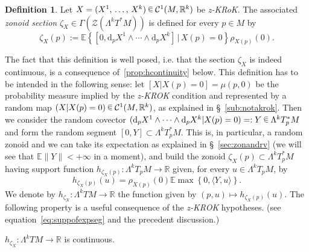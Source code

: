 \documentclass[10pt]{amsart}
\theoremstyle{definition}\newtheorem{defi}[theo]{Definition}\newtheorem{rema}[theo]{Remark}\newtheorem{exam}[theo]{Example}\newtheorem{exem}[theo]{Example}\newtheorem{nota}[theo]{Notation}
\newcommand{\R}{\mathbb{R}}
\newcommand{\EE}{\mathbb{E}}
\newcommand{\ZZ}{\mathscr{Z}}
\newcommand{\dd}{\mathrm{d}}
\newcommand{\mC}{\mathcal{C}}
\newcommand{\zkrok}{\emph{z-KROK}\xspace}
\newcommand*\randin{
\mathchoice {\raisebox{-.35ex}{$\displaystyle{^\subset}$}\mkern-11.5mu\raisebox{+.45ex}{$\displaystyle{_\subset}$}} {\mkern+1mu\raisebox{-.27ex}{$\textstyle{^\subset}$}\mkern-11.7mu\raisebox{+.45ex}{$\textstyle{_\subset}$}} {\raisebox{.35ex}{$\scriptstyle\subset$}\mkern-14mu\raisebox{-.15ex}{$\scriptstyle\subset$}} {\raisebox{.3ex}{$\scriptscriptstyle\subset$}\mkern-13.5mu\raisebox{-.10ex}{$\scriptscriptstyle\subset$}}}
\begin{document}
\begin{defi}\label{def:zonoidsec}
Let $X=(X^1,\,\ldots,\,X^k)\,\randin\, \mC^1(M,\R^k)$ be \emph{z-KRoK}. The associated \emph{zonoid section} $\zeta_X\in \Gamma(\ZZ(\Lambda^k T^*M))$ is defined for every $p\in M$ by
\begin{equation*}
\zeta_X(p):=\EE\left\{\left[0,\dd_pX^1\wedge\cdots\wedge\dd_p X^k\right]\,\Big|\,X(p)=0\right\}\rho_{X(p)}(0).
\end{equation*}
\end{defi}

The fact that this definition is well posed, i.e. that the section $\zeta_X$ is indeed continuous, is a consequence of~\cref{prop:hcontinuity} below. This definition has to be intended in the following sense: let $[X|X(p)=0]=\mu(p,0)$ be the probability measure implied by the {\zkrok} condition and represented by a random map $(X|X(p)=0)\,\randin\, \mC^1(M,\R^k)$, as explained in \S~\ref{sub:notakrok}. Then we consider the random covector $(\dd_pX^1\wedge\cdots\wedge\dd_p X^k|X(p)=0)=:Y\,\randin\, \Lambda^kT_p^*M$ and form the random segment $[0,Y]\subset \Lambda^kT^*_pM$. This is, in particular, a random zonoid and we can take its expectation as explained in \S~\ref{sec:zonandrv} (we will see that $\EE\|Y\|<+\infty$ in a moment), and build the zonoid $\zeta_X(p)\subset \Lambda^kT^*_pM$ having support function $ h_{\zeta_{X}(p)}\colon \Lambda^kT_pM\to \R$ given, for every $u\in\Lambda^kT_pM$, by
\begin{equation*}
h_{\zeta_X(p)}(u)=\rho_{X(p)}(0) \EE\max\left\{0,\langle Y,u\rangle \right\}.
\end{equation*}
We denote by $h_{\zeta_X}\colon \Lambda^kTM\to\R$ the function given by $(p,u)\mapsto h_{\zeta_X(p)}(u)$. The following property is a useful consequence of the {\zkrok} hypotheses. (see equation~\eqref{eq:suppofexpseg} and the precedent discussion.)

\begin{prop}\label{prop:hcontinuity}
$h_{\zeta_X}\colon \Lambda^kTM\to \R$ is continuous.
\end{prop}
\end{document}
